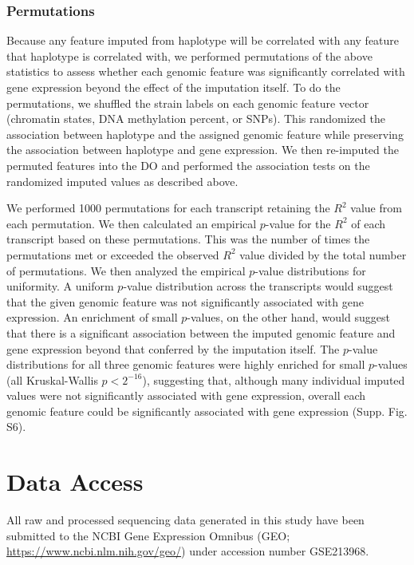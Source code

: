 \documentclass[
  11pt,
]{article}
\begin{document}
\hypertarget{permutations}{%
\subsubsection{Permutations}\label{permutations}}

Because any feature imputed from haplotype will be correlated with any
feature that haplotype is correlated with, we performed permutations of
the above statistics to assess whether each genomic feature was
significantly correlated with gene expression beyond the effect of the
imputation itself. To do the permutations, we shuffled the strain labels
on each genomic feature vector (chromatin states, DNA methylation
percent, or SNPs). This randomized the association between haplotype and
the assigned genomic feature while preserving the association between
haplotype and gene expression. We then re-imputed the permuted features
into the DO and performed the association tests on the randomized
imputed values as described above.

We performed 1000 permutations for each transcript retaining the \(R^2\)
value from each permutation. We then calculated an empirical \(p\)-value
for the \(R^2\) of each transcript based on these permutations. This was
the number of times the permutations met or exceeded the observed
\(R^2\) value divided by the total number of permutations. We then
analyzed the empirical \(p\)-value distributions for uniformity. A
uniform \(p\)-value distribution across the transcripts would suggest
that the given genomic feature was not significantly associated with
gene expression. An enrichment of small \(p\)-values, on the other hand,
would suggest that there is a significant association between the
imputed genomic feature and gene expression beyond that conferred by the
imputation itself. The \(p\)-value distributions for all three genomic
features were highly enriched for small \(p\)-values (all Kruskal-Wallis
\(p < 2^{-16}\)), suggesting that, although many individual imputed
values were not significantly associated with gene expression, overall
each genomic feature could be significantly associated with gene
expression (Supp. Fig. S6).

\hypertarget{data-access}{%
\section{Data Access}\label{data-access}}

All raw and processed sequencing data generated in this study have been
submitted to the NCBI Gene Expression Omnibus (GEO;
\url{https://www.ncbi.nlm.nih.gov/geo/}) under accession number
GSE213968.
\end{document}
